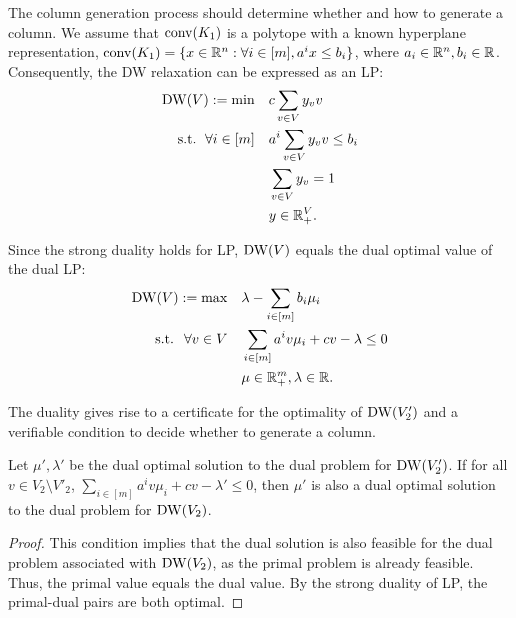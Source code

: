 The column generation process should determine whether and how to generate a column. We assume that $\operatorname{conv}(K_1)$ is a polytope with a known hyperplane representation, \ie $\operatorname{conv}(K_1)=\{x \in \mathbb R^n: \forall i \in [m], a^ix \le b_i\}$, where $a_i \in \mathbb R^n, b_i \in \mathbb R$. Consequently, the DW relaxation can be expressed as an LP:
 \begin{subequations}
    \label{dwrellp}
    \begin{align}
       \operatorname{DW}(V):=\min &  \quad c \sum_{v \in V}  y_v v  \\
    \textup{ s.t. } \, \forall i \in [m] & \quad  a^i \sum_{v \in V}  y_v v  \le b_i \\
       &  \quad  \sum_{v \in V} y_v = 1\\
      & \quad y \in \mathbb R^V_+.
    \end{align}
\end{subequations}

Since the strong duality  holds for LP, $\operatorname{DW}(V)$ equals the dual optimal value of the dual LP:
 \begin{subequations}
    \label{dwrelduallp}
    \begin{align}
       \operatorname{DW}(V):=\max  &  \quad  \lambda -\sum_{i \in [m]}  b_i \mu_i  \\
    \textup{ s.t. } \; \forall v \in V & \quad \sum_{i \in [m]}a^i v  \mu_i + c v - \lambda \le 0 \\
       &  \quad  \mu \in \mathbb R^m_+, \lambda \in \mathbb R.
    \end{align}
\end{subequations}

The duality gives rise to  a certificate for the optimality of $\operatorname{DW}(V'_2)$ and a  verifiable condition to decide whether to generate a column. 

\begin{lemma}
  Let $\mu',\lambda'$ be the dual optimal solution to the dual problem for  $\operatorname{DW}(V'_2)$. If for all $v \in V_2 \setminus V'_2$,  $\sum_{i \in [m]}a^i v  \mu
  _i + c v - \lambda' \le 0$, then  $\mu'$ is also a dual optimal solution to the dual problem for  $\operatorname{DW}(V_2)$. 
\end{lemma}
\begin{proof}
    This condition implies that the dual solution is also feasible for the dual problem associated with $\operatorname{DW}(V_2)$, as the primal problem is already feasible. Thus, the primal value equals the dual value.  By the strong duality of LP, the primal-dual pairs are both optimal.
\end{proof}



